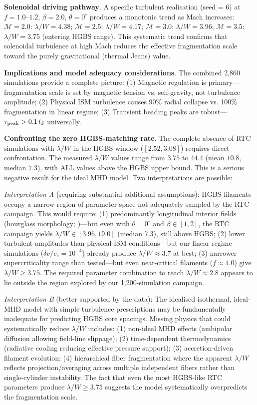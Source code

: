 \documentclass[twocolumn,longtitle,usenatbib]{mnras}
\begin{document}
\textbf{Solenoidal driving pathway}. A specific turbulent realisation (seed = 6) at $f = 1.0$--$1.2$, $\beta = 2.0$, $\theta = 0^\circ$ produces a monotonic trend as Mach increases: $\mathcal{M} = 2.0$: $\lambda/W = 4.38$; $\mathcal{M} = 2.5$: $\lambda/W = 4.17$; $\mathcal{M} = 3.0$: $\lambda/W = 3.96$; $\mathcal{M} = 3.5$: $\lambda/W = 3.75$ (entering HGBS range). This systematic trend confirms that solenoidal turbulence at high Mach reduces the effective fragmentation scale toward the purely gravitational (thermal Jeans) value.

\textbf{Implications and model adequacy considerations}. The combined 2,860 simulations provide a complete picture: (1) Magnetic regulation is primary—fragmentation scale is set by magnetic tension vs. self-gravity, not turbulence amplitude; (2) Physical ISM turbulence causes 90\% radial collapse vs. 100\% fragmentation in linear regime; (3) Transient beading peaks are robust—$\tau_{\rm peak} > 0.1\,t_{\rm J}$ universally.

\textbf{Confronting the zero HGBS-matching rate}. The complete absence of RTC simulations with $\lambda/W$ in the HGBS window ($[2.52, 3.08]$) requires direct confrontation. The measured $\lambda/W$ values range from $3.75$ to $44.4$ (mean $10.8$, median $7.3$), with ALL values above the HGBS upper bound. This is a serious negative result for the ideal MHD model. Two interpretations are possible:

\textit{Interpretation A} (requiring substantial additional assumptions): HGBS filaments occupy a narrow region of parameter space not adequately sampled by the RTC campaign. This would require: (1) predominantly longitudinal interior fields (hourglass morphology; \citet{Jadhav2026})—but even with $\theta = 0^\circ$ and $\beta \in [1, 2]$, the RTC campaign yields $\lambda/W \in [3.96, 19.0]$ (median 7.3), still above HGBS; (2) lower turbulent amplitudes than physical ISM conditions—but our linear-regime simulations ($\delta v/c_s = 10^{-4}$) already produce $\lambda/W \approx 3.7$ at best; (3) narrower supercriticality range than tested—but even near-critical filaments ($f \approx 1.0$) give $\lambda/W \geq 3.75$. The required parameter combination to reach $\lambda/W \approx 2.8$ appears to lie outside the region explored by our 1,200-simulation campaign.

\textit{Interpretation B} (better supported by the data): The idealised isothermal, ideal-MHD model with simple turbulence prescriptions may be fundamentally inadequate for predicting HGBS core spacings. Missing physics that could systematically reduce $\lambda/W$ includes: (1) non-ideal MHD effects (ambipolar diffusion allowing field-line slippage); (2) time-dependent thermodynamics (radiative cooling reducing effective pressure support); (3) accretion-driven filament evolution; (4) hierarchical fiber fragmentation where the apparent $\lambda/W$ reflects projection/averaging across multiple independent fibers rather than single-cylinder instability. The fact that even the most HGBS-like RTC parameters produce $\lambda/W \geq 3.75$ suggests the model systematically overpredicts the fragmentation scale.
\end{document}
